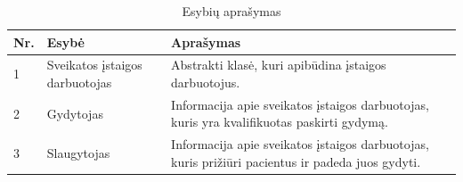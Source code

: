 \begin{table}[!ht]
    \centering
    \renewcommand{\arraystretch}{1.2}
    \renewcommand\thetable{7}

    \begin{tabular}{|m{3em}|m{12em}|m{22em}|}
    \hline 
    \rowcolor[HTML]{EFEFEF} 
    Nr. & Esybė & Aprašymas \\ \hline

    1  &  Sveikatos įstaigos darbuotojas  & Abstrakti klasė, kuri apibūdina įstaigos darbuotojus.      \\ \hline
    2  &  Gydytojas  & Informacija apie sveikatos įstaigos darbuotojas, kuris yra kvalifikuotas paskirti gydymą.     \\ \hline
    3  &  Slaugytojas  & Informacija apie sveikatos įstaigos darbuotojas, kuris prižiūri pacientus ir padeda juos gydyti.    \\ \hline

    \end{tabular}
    \caption{Esybių aprašymas} 

\end{table}

